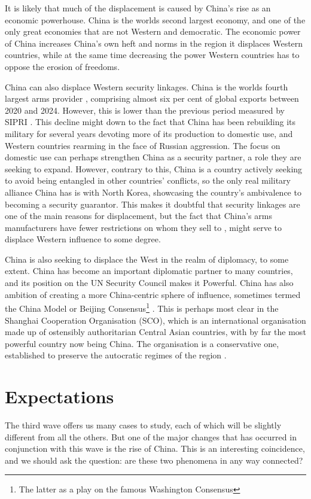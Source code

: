 It is likely that much of the displacement is caused by China's rise as an economic powerhouse. China is the worlds second largest economy, and one of the only great economies that are not Western and democratic. The economic power of China increases China's own heft and norms in the region it displaces Western countries, while at the same time decreasing the power Western countries has to oppose the erosion of freedoms. 

China can also displace Western security linkages. China is the worlds fourth largest arms provider \citep{george_trends_2025, gunter_chinas_2024}, comprising almost six per cent of global exports between 2020 and 2024. However, this is lower than the previous period measured by SIPRI \citep{george_trends_2025}. This decline might down to the fact that China has been rebuilding its military for several years devoting more of its production to domestic use, and Western countries rearming in the face of Russian aggression. The focus on domestic use can perhaps strengthen China as a security partner, a role they are seeking to expand. However, contrary to this, China is a country actively seeking to avoid being entangled in other countries' conflicts, so the only real military alliance China has is with North Korea, showcasing the country's ambivalence to becoming a security guarantor. This makes it doubtful that security linkages are one of the main reasons for displacement, but the fact that China's arms manufacturers have fewer restrictions on whom they sell to \citep{gunter_chinas_2024}, might serve to displace Western influence to some degree.

China is also seeking to displace the West in the realm of diplomacy, to some extent. China has become an important diplomatic partner to many countries, and its position on the UN Security Council makes it Powerful. China has also ambition of creating a more China-centric sphere of influence, sometimes termed the China Model or Beijing Consensus\footnote{The latter as a play on the famous Washington Consensus} \citep{ambrosio_rise_2012, economy_exporting_2020}. This is perhaps most clear in the Shanghai Cooperation Organisation (SCO), which is an international organisation made up of ostensibly authoritarian Central Asian countries, with by far the most powerful country now being China. The organisation is a conservative one, established to preserve the autocratic regimes of the region \citep[p. 1322]{ambrosio_catching_2008}. 

\section{Expectations} \label{sec:hypotheses}
The third wave offers us many cases to study, each of which will be slightly different from all the others. But one of the major changes that has occurred in conjunction with this wave is the rise of China. This is an interesting coincidence, and we should ask the question: are these two phenomena in any way connected?

